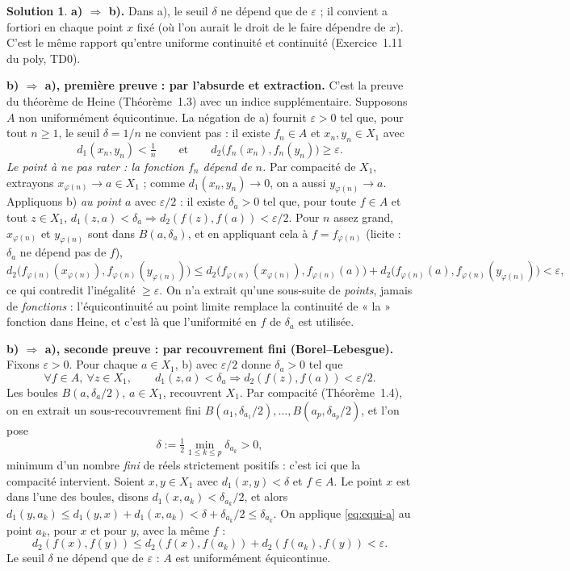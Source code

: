 \documentclass[11pt,a4paper]{article}
\theoremstyle{definition}
\newtheorem*{solution}{Solution}
\begin{document}
\begin{solution}
\noindent\textbf{a) $\Rightarrow$ b).} Dans a), le seuil $\delta$ ne dépend que de $\varepsilon$ ; il convient a fortiori en chaque point $x$ fixé (où l'on aurait le droit de le faire dépendre de $x$). C'est le même rapport qu'entre uniforme continuité et continuité (Exercice~1.11 du poly, TD0).

\medskip
\noindent\textbf{b) $\Rightarrow$ a), première preuve : par l'absurde et extraction.} C'est la preuve du théorème de Heine (Théorème~1.3) avec un indice supplémentaire. Supposons $A$ non uniformément équicontinue. La négation de a) fournit $\varepsilon>0$ tel que, pour tout $n\ge1$, le seuil $\delta=1/n$ ne convient pas : il existe $f_n\in A$ et $x_n,y_n\in X_1$ avec
\[
d_1(x_n,y_n)<\tfrac1n\qquad\text{et}\qquad d_2\big(f_n(x_n),f_n(y_n)\big)\ge\varepsilon .
\]
\emph{Le point à ne pas rater : la fonction $f_n$ dépend de $n$.} Par compacité de $X_1$, extrayons $x_{\varphi(n)}\to a\in X_1$ ; comme $d_1(x_n,y_n)\to0$, on a aussi $y_{\varphi(n)}\to a$. Appliquons b) \emph{au point $a$} avec $\varepsilon/2$ : il existe $\delta_a>0$ tel que, pour toute $f\in A$ et tout $z\in X_1$, $d_1(z,a)<\delta_a\Rightarrow d_2(f(z),f(a))<\varepsilon/2$. Pour $n$ assez grand, $x_{\varphi(n)}$ et $y_{\varphi(n)}$ sont dans $B(a,\delta_a)$, et en appliquant cela à $f=f_{\varphi(n)}$ (licite : $\delta_a$ ne dépend pas de $f$),
\[
d_2\big(f_{\varphi(n)}(x_{\varphi(n)}),f_{\varphi(n)}(y_{\varphi(n)})\big)\le d_2\big(f_{\varphi(n)}(x_{\varphi(n)}),f_{\varphi(n)}(a)\big)+d_2\big(f_{\varphi(n)}(a),f_{\varphi(n)}(y_{\varphi(n)})\big)<\varepsilon ,
\]
ce qui contredit l'inégalité $\ge\varepsilon$. On n'a extrait qu'une sous-suite de \emph{points}, jamais de \emph{fonctions} : l'équicontinuité au point limite remplace la continuité de « la » fonction dans Heine, et c'est là que l'uniformité en $f$ de $\delta_a$ est utilisée.

\medskip
\noindent\textbf{b) $\Rightarrow$ a), seconde preuve : par recouvrement fini (Borel--Lebesgue).} Fixons $\varepsilon>0$. Pour chaque $a\in X_1$, b) avec $\varepsilon/2$ donne $\delta_a>0$ tel que
\begin{equation}\label{eq:equi-a}
\forall f\in A,\ \forall z\in X_1,\qquad d_1(z,a)<\delta_a\Rightarrow d_2(f(z),f(a))<\varepsilon/2 .
\end{equation}
Les boules $B(a,\delta_a/2)$, $a\in X_1$, recouvrent $X_1$. Par compacité (Théorème~1.4), on en extrait un sous-recouvrement fini $B(a_1,\delta_{a_1}/2),\dots,B(a_p,\delta_{a_p}/2)$, et l'on pose
\[
\delta:=\tfrac12\min_{1\le k\le p}\delta_{a_k}>0 ,
\]
minimum d'un nombre \emph{fini} de réels strictement positifs : c'est ici que la compacité intervient. Soient $x,y\in X_1$ avec $d_1(x,y)<\delta$ et $f\in A$. Le point $x$ est dans l'une des boules, disons $d_1(x,a_k)<\delta_{a_k}/2$, et alors $d_1(y,a_k)\le d_1(y,x)+d_1(x,a_k)<\delta+\delta_{a_k}/2\le\delta_{a_k}$. On applique \eqref{eq:equi-a} au point $a_k$, pour $x$ et pour $y$, avec la même $f$ :
\[
d_2(f(x),f(y))\le d_2(f(x),f(a_k))+d_2(f(a_k),f(y))<\varepsilon .
\]
Le seuil $\delta$ ne dépend que de $\varepsilon$ : $A$ est uniformément équicontinue.
\end{solution}
\end{document}

